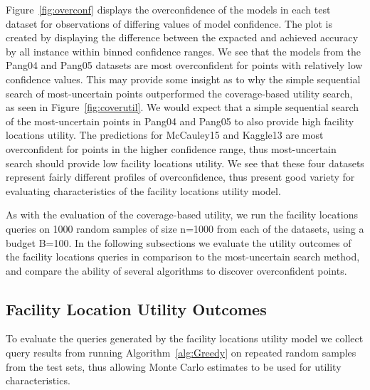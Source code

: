 \documentclass[letterpaper]{article} %
\begin{document}
Figure~\ref{fig:overconf} displays the overconfidence of the models in each test dataset for observations of differing values of model confidence. The plot is created by displaying the difference between the expacted and achieved accuracy by all instance within binned confidence ranges.  We see that the models from the Pang04 and Pang05 datasets are most overconfident for points with relatively low confidence values. This may provide some insight as to why the simple sequential search of most-uncertain points outperformed the coverage-based utility search, as seen in Figure~\ref{fig:coverutil}. We would expect that a simple sequential search of the most-uncertain points in Pang04 and Pang05 to also provide high facility locations utility. The predictions for McCauley15 and Kaggle13 are most overconfident for points in the higher confidence range, thus most-uncertain search should provide low facility locations utility. We see that these four datasets represent fairly different profiles of overconfidence, thus present good variety for evaluating characteristics of the facility locations utility model. 

As with the evaluation of the coverage-based utility, we run the facility locations queries on 1000 random samples of size n=1000 from each of the datasets, using a budget B=100. In the following subsections we evaluate the utility outcomes of the facility locations queries in comparison to the most-uncertain search method, and compare the ability of several algorithms to discover overconfident points.

\subsection{Facility Location Utility Outcomes}

To evaluate the queries generated by the facility locations utility model we collect query results from running Algorithm~\ref{alg:Greedy} on repeated random samples from the test sets, thus allowing Monte Carlo estimates to be used for utility characteristics. 
\end{document}
